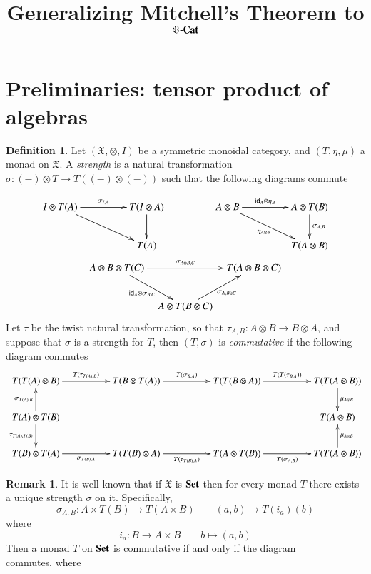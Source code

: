 \documentclass[12pt]{article}
\title{Generalizing Mitchell's Theorem to $\mathfrak V\textbf{\textup{-Cat}}$}
\author{}
\theoremstyle{definition}
\newtheorem{definition}[lemma]{Definition}
\newtheorem{remark}[lemma]{Remark}
\def\X{\mathfrak X}
\newcommand{\Set}{\textbf{\textup{Set}}}
\numberwithin{equation}{section}
\newcommand{\id}[1]{\mathsf{id}_{#1}}
\begin{document}
	
	\maketitle
	\section{Preliminaries: tensor product of algebras}	
	\begin{definition}
Let $(\X, \otimes, I)$ be a symmetric monoidal category, and $(T, \eta, \mu)$ a monad on $\X$. A \emph{strength} is a natural transformation $\sigma:(-)\otimes T \to T((-) \otimes (-))$  such that the following diagrams commute

\begin{gather*}
\xymatrix@C=20pt{ I \otimes T(A) \ar[rr]^{\sigma_{I,A}} \ar[drr]&&T(I\otimes A) \ar[d]& &A\otimes B \ar[drr]_{\eta_{A\otimes B}} \ar[rr]^-{\id{A}\otimes \eta_B}& &A\otimes T(B)\ar[d]^{\sigma_{A,B}}\\
	&& T(A) && & &T(A\otimes B)}\\
\xymatrix@C=8pt{A\otimes B \otimes T(C)\ar[rr]^{\sigma_{A\otimes B, C} }\ar[dr]_{\id{A}\otimes\sigma_{B,C}} &&  T(A\otimes B \otimes C)\\
& A \otimes T(B\otimes C)\ar[ur]_{\sigma_{A,B\otimes C}}}
\end{gather*}
Let $\tau$ be the twist natural transformation, so that $\tau_{A,B}:A\otimes B\to B\otimes A$, and suppose that $\sigma$ is a strength for $T$, then $(T,\sigma)$ is \emph{commutative} if the following diagram commutes
\[\xymatrix@C=50pt{ T(T(A)\otimes B)\ar[r]^{T(\tau_{T(A),B})}& T(B\otimes T(A)) \ar[r]^{T(\sigma_{B,A})} & T(T(B\otimes A)) \ar[r]^{T(T(\tau_{B,A}))} & T(T(A\otimes B)) \ar[d]^{\mu_{A\otimes B}}\\
	T(A) \otimes T(B) \ar[u]^{\sigma_{T(A),B}}  \ar[d]_{\tau_{T(A),T(B)}}& & &T(A\otimes B)\\
	T(B)\otimes T(A) \ar[r]_{\sigma_{T(B), A}} &T(T(B)\otimes A) \ar[r]_{T(\tau_{T(B),A})}&T(A\otimes T(B)) \ar[r]_{T(\sigma_{A,B})} & T(T(A\otimes B)) \ar[u]_{\mu_{A\otimes B}}}\]	\end{definition}
	
	
	\begin{remark}
	It is well known that if $\X$ is $\Set$ then for every monad $T$ there exists a unique strength $\sigma$ on it. Specifically,
	\[\sigma_{A,B}: A\times T(B) \to T(A\times B) \qquad (a,b)\mapsto T(i_a)(b)\]
	 where 
	 \[i_a: B\to  A\times B \qquad b\mapsto (a, b)\]
Then a monad $T$ on $\Set$ is commutative if and only if the diagram 
\[\]
commutes, where

	\end{remark}
\end{document}
